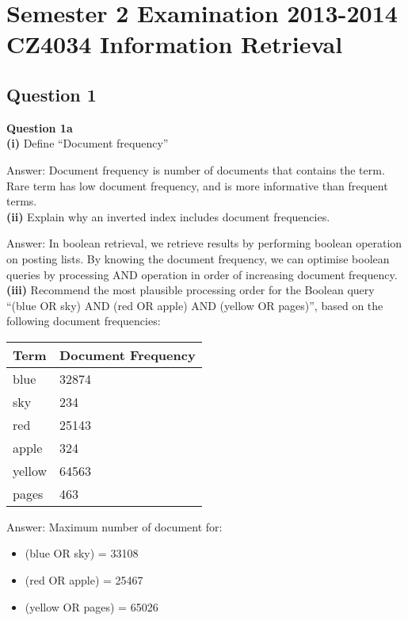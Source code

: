 \documentclass[11pt,a4paper]{report}
\begin{document}
\chapter{Semester 2 Examination 2013-2014\\CZ4034 Information Retrieval}

\begin{multicols*}{2}

\section{Question 1}

\noindent \textbf{Question 1a} \\

\noindent \textbf{(i)} Define ``Document frequency''

\noindent Answer: Document frequency is number of documents that contains the term. Rare term has low document frequency, and is more informative than frequent terms.\\

\noindent \textbf{(ii)} Explain why an inverted index includes document frequencies.

\noindent Answer: In boolean retrieval, we retrieve results by performing boolean operation on posting lists. By knowing the document frequency, we can optimise boolean queries by processing AND operation in order of increasing document frequency.\\

\noindent \textbf{(iii)} Recommend the most plausible processing order for the Boolean query ``(blue OR sky) AND (red OR apple) AND (yellow OR pages)'', based on the following document frequencies:

\begin{center}
\begin{tabular}{ | l | l |} 
    \hline
    Term  & Document Frequency\\
    \hline
    blue  & 32874 \\
    sky   & 234 \\
    red   & 25143 \\
    apple & 324 \\
    yellow& 64563 \\
    pages & 463 \\
    \hline
\end{tabular}
\end{center}

\noindent Answer: Maximum number of document for:
\begin{itemize}
    \item (blue OR sky) = 33108
    \item (red OR apple) = 25467
    \item (yellow OR pages) = 65026
\end{itemize}


\end{multicols*}
\end{document}
